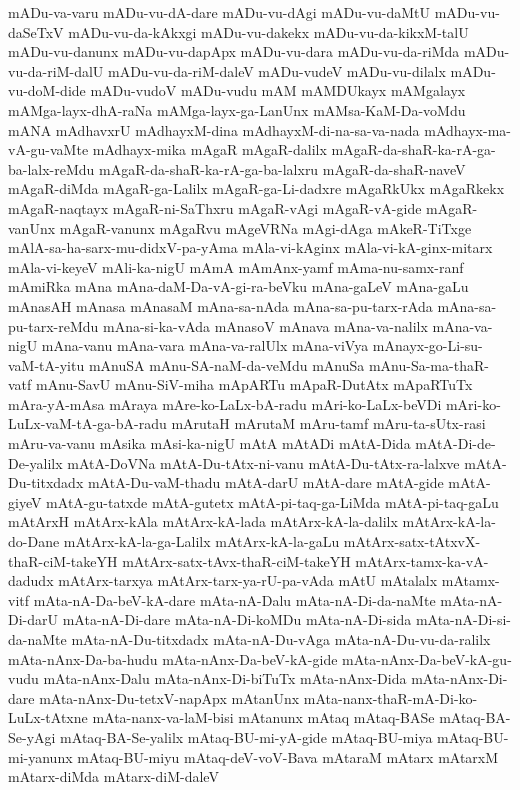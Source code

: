{mADu-va-varu
mADu-vu-dA-dare
mADu-vu-dAgi
mADu-vu-daMtU
mADu-vu-daSeTxV
mADu-vu-da-kAkxgi
mADu-vu-dakekx
mADu-vu-da-kikxM-talU
mADu-vu-danunx
mADu-vu-dapApx
mADu-vu-dara
mADu-vu-da-riMda
mADu-vu-da-riM-dalU
mADu-vu-da-riM-daleV
mADu-vudeV
mADu-vu-dilalx
mADu-vu-doM-dide
mADu-vudoV
mADu-vudu
mAM
mAMDUkayx
mAMgalayx
mAMga-layx-dhA-raNa
mAMga-layx-ga-LanUnx
mAMsa-KaM-Da-voMdu
mANA
mAdhavxrU
mAdhayxM-dina
mAdhayxM-di-na-sa-va-nada
mAdhayx-ma-vA-gu-vaMte
mAdhayx-mika
mAgaR
mAgaR-dalilx
mAgaR-da-shaR-ka-rA-ga-ba-lalx-reMdu
mAgaR-da-shaR-ka-rA-ga-ba-lalxru
mAgaR-da-shaR-naveV
mAgaR-diMda
mAgaR-ga-Lalilx
mAgaR-ga-Li-dadxre
mAgaRkUkx
mAgaRkekx
mAgaR-naqtayx
mAgaR-ni-SaThxru
mAgaR-vAgi
mAgaR-vA-gide
mAgaR-vanUnx
mAgaR-vanunx
mAgaRvu
mAgeVRNa
mAgi-dAga
mAkeR-TiTxge
mAlA-sa-ha-sarx-mu-didxV-pa-yAma
mAla-vi-kAginx
mAla-vi-kA-ginx-mitarx
mAla-vi-keyeV
mAli-ka-nigU
mAmA
mAmAnx-yamf
mAma-nu-samx-ranf
mAmiRka
mAna
mAna-daM-Da-vA-gi-ra-beVku
mAna-gaLeV
mAna-gaLu
mAnasAH
mAnasa
mAnasaM
mAna-sa-nAda
mAna-sa-pu-tarx-rAda
mAna-sa-pu-tarx-reMdu
mAna-si-ka-vAda
mAnasoV
mAnava
mAna-va-nalilx
mAna-va-nigU
mAna-vanu
mAna-vara
mAna-va-ralUlx
mAna-viVya
mAnayx-go-Li-su-vaM-tA-yitu
mAnuSA
mAnu-SA-naM-da-veMdu
mAnuSa
mAnu-Sa-ma-thaR-vatf
mAnu-SavU
mAnu-SiV-miha
mApARTu
mApaR-DutAtx
mApaRTuTx
mAra-yA-mAsa
mAraya
mAre-ko-LaLx-bA-radu
mAri-ko-LaLx-beVDi
mAri-ko-LuLx-vaM-tA-ga-bA-radu
mArutaH
mArutaM
mAru-tamf
mAru-ta-sUtx-rasi
mAru-va-vanu
mAsika
mAsi-ka-nigU
mAtA
mAtADi
mAtA-Dida
mAtA-Di-de-De-yalilx
mAtA-DoVNa
mAtA-Du-tAtx-ni-vanu
mAtA-Du-tAtx-ra-lalxve
mAtA-Du-titxdadx
mAtA-Du-vaM-thadu
mAtA-darU
mAtA-dare
mAtA-gide
mAtA-giyeV
mAtA-gu-tatxde
mAtA-gutetx
mAtA-pi-taq-ga-LiMda
mAtA-pi-taq-gaLu
mAtArxH
mAtArx-kAla
mAtArx-kA-lada
mAtArx-kA-la-dalilx
mAtArx-kA-la-do-Dane
mAtArx-kA-la-ga-Lalilx
mAtArx-kA-la-gaLu
mAtArx-satx-tAtxvX-thaR-ciM-takeYH
mAtArx-satx-tAvx-thaR-ciM-takeYH
mAtArx-tamx-ka-vA-dadudx
mAtArx-tarxya
mAtArx-tarx-ya-rU-pa-vAda
mAtU
mAtalalx
mAtamx-vitf
mAta-nA-Da-beV-kA-dare
mAta-nA-Dalu
mAta-nA-Di-da-naMte
mAta-nA-Di-darU
mAta-nA-Di-dare
mAta-nA-Di-koMDu
mAta-nA-Di-sida
mAta-nA-Di-si-da-naMte
mAta-nA-Du-titxdadx
mAta-nA-Du-vAga
mAta-nA-Du-vu-da-ralilx
mAta-nAnx-Da-ba-hudu
mAta-nAnx-Da-beV-kA-gide
mAta-nAnx-Da-beV-kA-gu-vudu
mAta-nAnx-Dalu
mAta-nAnx-Di-biTuTx
mAta-nAnx-Dida
mAta-nAnx-Di-dare
mAta-nAnx-Du-tetxV-napApx
mAtanUnx
mAta-nanx-thaR-mA-Di-ko-LuLx-tAtxne
mAta-nanx-va-laM-bisi
mAtanunx
mAtaq
mAtaq-BASe
mAtaq-BA-Se-yAgi
mAtaq-BA-Se-yalilx
mAtaq-BU-mi-yA-gide
mAtaq-BU-miya
mAtaq-BU-mi-yanunx
mAtaq-BU-miyu
mAtaq-deV-voV-Bava
mAtaraM
mAtarx
mAtarxM
mAtarx-diMda
mAtarx-diM-daleV
}
